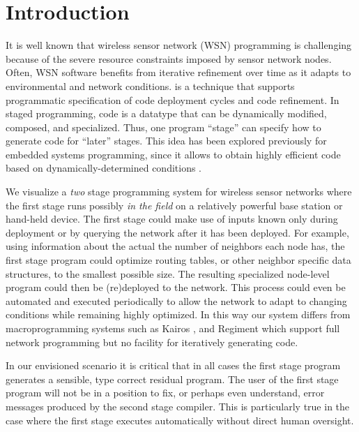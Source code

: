 \section{Introduction}
\label{section-introduction}

It is well known that wireless sensor network (WSN) programming is
challenging because of the severe resource constraints imposed by
sensor network nodes. Often, WSN software benefits from iterative
refinement over time as it adapts to environmental and network
conditions. 
\cite{Taha-MetaML,Sheard-TemplateHaskell,Mainland-Flask-2008,FramedML}
is a technique that supports programmatic specification of code
deployment cycles and code refinement. In staged programming, code is
a datatype that can be dynamically modified, composed, and
specialized. Thus, one program ``stage'' can specify how to generate
code for ``later'' stages. This idea has been explored previously for
embedded systems programming, since it allows to obtain highly
efficient code based on dynamically-determined conditions
\cite{Taha03generatingheap-bounded,DBLP:conf/icess/Taha04}.

We visualize a \emph{two} stage programming system for wireless sensor
networks where the first stage runs possibly \emph{in the field} on a
relatively powerful base station or hand-held device. The first stage
could make use of inputs known only during deployment or by querying
the network after it has been deployed. For example, using information
about the actual the number of neighbors each node has, the first
stage program could optimize routing tables, or other neighbor
specific data structures, to the smallest possible size. The resulting
specialized node-level program could then be (re)deployed to the
network. This process could even be automated and executed
periodically to allow the network to adapt to changing conditions
while remaining highly optimized. In this way our system differs from
macroprogramming systems such as Kairos
\cite{springerlink:10.1007/1150259312}, and Regiment
\cite{Newton:2007:RMS:1236360.1236422} which support full network
programming but no facility for iteratively generating code.

In our envisioned scenario it is critical that in all cases the first
stage program generates a sensible, type correct residual program. The
user of the first stage program will not be in a position to fix, or
perhaps even understand, error messages produced by the second stage
compiler. This is particularly true in the case where the first stage
executes automatically without direct human oversight.

